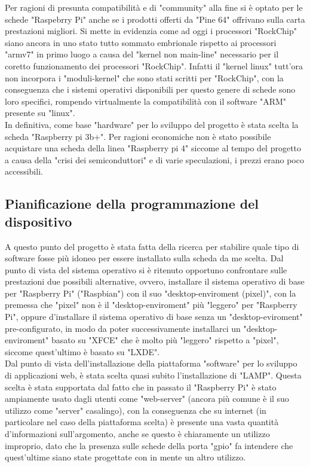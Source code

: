 Per ragioni di presunta compatibilità e di "community" alla fine si è optato per le schede "Raspebrry Pi" anche se i prodotti offerti da "Pine 64" offrivano sulla carta prestazioni migliori. Si mette in evidenzia come ad oggi i processori "RockChip" siano ancora in uno stato tutto sommato embrionale rispetto ai processori "armv7" in primo luogo a causa del "kernel non main-line" necessario per il coretto funzionamento dei processori "RockChip". Infatti il "kernel linux" tutt'ora non incorpora i "moduli-kernel" che sono stati scritti per "RockChip", con la conseguenza che i sistemi operativi disponibili per questo genere di schede sono loro specifici, rompendo virtualmente la compatibilità con il software "ARM" presente su "linux".\\
In definitiva, come base "hardware" per lo sviluppo del progetto è stata scelta la scheda "Raspberry pi 3b+". Per ragioni economiche non è stato possibile acquistare una scheda della linea "Raspberry pi 4" siccome al tempo del progetto a causa della "crisi dei semiconduttori" e di varie speculazioni, i prezzi erano poco accessibili.

\subsection{Pianificazione della programmazione del dispositivo}
A questo punto del progetto è stata fatta della ricerca per stabilire quale tipo di software fosse più idoneo per essere installato sulla scheda da me scelta. Dal punto di vista del sistema operativo si è ritenuto opportuno confrontare sulle prestazioni due possibili alternative, ovvero, installare il sistema operativo di base per "Raspberry Pi" ("Raspbian") con il suo "desktop-enviroment (pixel)", con la premessa che "pixel" non è il "desktop-enviroment" più "leggero" per "Raspberry Pi", oppure d'installare il sistema operativo di base senza un "desktop-eviroment" pre-configurato, in modo da poter successivamente installarci un "desktop-enviroment" basato su "XFCE" che è molto più "leggero" rispetto a "pixel", siccome quest'ultimo è basato su "LXDE".\\
Dal punto di vista dell'installazione della piattaforma "software" per lo sviluppo di applicazioni web, è stata scelta quasi subito l'installazione di "LAMP". Questa scelta è stata supportata dal fatto che in passato il "Raspberry Pi" è stato ampiamente usato dagli utenti come "web-server" (ancora più comune è il suo utilizzo come "server" casalingo), con la conseguenza che su internet (in particolare nel caso della piattaforma scelta) è presente una vasta quantità d'informazioni sull'argomento,  anche se questo è chiaramente un utilizzo improprio, dato che la presenza sulle schede della porta "gpio" fa intendere che quest'ultime siano state progettate con in mente un altro utilizzo. 

